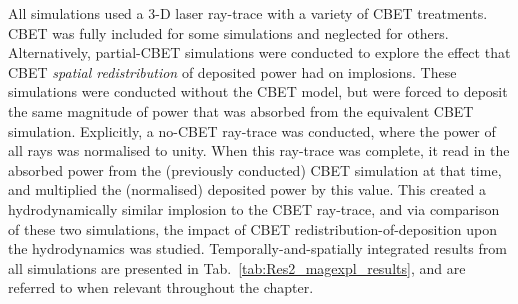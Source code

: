 All simulations used a 3-D laser ray-trace with a variety of \ac{CBET} treatments.
\ac{CBET} was fully included for some simulations and neglected for others.
Alternatively, partial-\ac{CBET} simulations were conducted to explore the effect that \ac{CBET} \textit{spatial redistribution} of deposited power had on implosions.
These simulations were conducted without the \ac{CBET} model, but were forced to deposit the same magnitude of power that was absorbed from the equivalent \ac{CBET} simulation.
Explicitly, a no-\ac{CBET} ray-trace was conducted, where the power of all rays was normalised to unity.
When this ray-trace was complete, it read in the absorbed power from the (previously conducted) \ac{CBET} simulation at that time, and multiplied the (normalised) deposited power by this value.
This created a hydrodynamically similar implosion to the \ac{CBET} ray-trace, and via comparison of these two simulations, the impact of \ac{CBET} redistribution-of-deposition upon the hydrodynamics was studied.
Temporally-and-spatially integrated results from all simulations are presented in Tab.~\ref{tab:Res2_magexpl_results}, and are referred to when relevant throughout the chapter.

